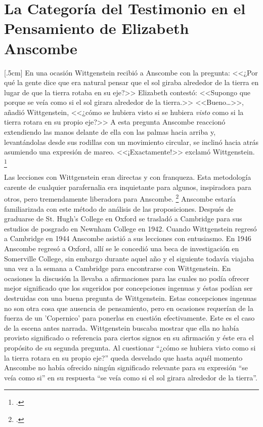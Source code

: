 \documentclass[../main.tex]{subfiles}
\begin{document}
\chapter*{La Categoría del Testimonio en el Pensamiento de Elizabeth Anscombe}


[.5cm]
En una ocasión Wittgenstein recibió a Anscombe con la pregunta: <<¿Por qué la gente dice que era natural pensar que el sol giraba alrededor de la tierra en lugar de que la tierra rotaba en su eje?>> Elizabeth contestó: <<Supongo que porque se veía como si el sol girara alrededor de la tierra.>> <<Bueno\ldots>>, añadió Wittgenstein, <<¿cómo se hubiera visto si se hubiera \emph{visto} como si la tierra rotara en su propio eje?>> A esta pregunta Anscombe reaccionó extendiendo las manos delante de ella con las palmas hacia arriba y, levantándolas desde sus rodillas con un movimiento circular, se inclinó hacia atrás asumiendo una expresión de mareo. <<¡Exactamente!>> exclamó Wittgenstein. \footcite[151]{IWT}

Las lecciones con Wittgenstein eran directas y con franqueza. Esta metodología carente de cualquier parafernalia era inquietante para algunos, inspiradora para otros, pero tremendamente liberadora para Anscombe. \footcite[loc 9853 Chapter 4, Section 24, para. 5]{monk} Anscombe estaría familiarizada con este método de análisis de las proposiciones. Después de graduarse de St. Hugh's College en Oxford se trasladó a Cambridge para sus estudios de posgrado en Newnham College en 1942. Cuando Wittgenstein regresó a Cambridge en 1944 Anscombe asistió a sus lecciones con entusiasmo. En 1946 Anscombe regresó a Oxford, allí se le concedió una beca de investigación en Somerville College, sin embargo durante aquel año y el siguiente todavía viajaba una vez a la semana a Cambridge para encontrarse con Wittgenstein.  En ocasiones la discusión la llevaba a afirmaciones para las cuales no podía ofrecer mejor significado que los sugeridos por concepciones ingenuas y éstas podían ser destruidas con una buena pregunta de Wittgenstein. Estas concepciones ingenuas no son otra cosa que ausencia de pensamiento, pero en ocasiones requerían de la fuerza de un 'Copernico' para ponerlas en cuestión efectivamente. Este es el caso de la escena antes narrada. Wittgenstein buscaba mostrar que ella no había provisto significado o referencia para ciertos signos en su afirmación y éste era el propósito de su segunda pregunta. Al cuestionar ``¿cómo se hubiera visto como si la tierra rotara en su propio eje?'' queda desvelado que hasta aquél momento Anscombe no había ofrecido ningún significado relevante para su expresión ``se veía como si'' en su respuesta ``se veía como si el sol girara alrededor de la tierra''. 
\end{document}

